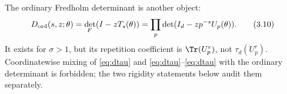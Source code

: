The ordinary Fredholm determinant is another object:
\[
 D_{\rm ord}(s,z;\theta)
 =\det_{\!F}(I-zT_s(\theta))
 =\prod_p\det(I_d-zp^{-s}U_p(\theta)).                      \tag{3.10}
\]
It exists for $\sigma>1$, but its repetition coefficient is
$\Tr(U_p^r)$, not $\tau_d(U_p^r)$.  Coordinatewise mixing of
\cref{eq:dtau} and \eqref{eq:dtau}--\eqref{eq:dtau} with the ordinary
determinant is forbidden; the two rigidity statements below audit them
separately.
